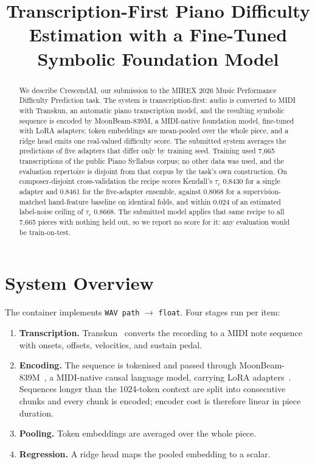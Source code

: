 \documentclass{article}
\title{Transcription-First Piano Difficulty Estimation with a Fine-Tuned
Symbolic Foundation Model}
\begin{document}
\maketitle

\begin{abstract}
We describe CrescendAI, our submission to the MIREX 2026 Music Performance
Difficulty Prediction task. The system is transcription-first: audio is
converted to MIDI with Transkun, an automatic piano transcription model, and
the resulting symbolic sequence is encoded by MoonBeam-839M, a MIDI-native
foundation model, fine-tuned with LoRA adapters; token embeddings are mean-pooled
over the whole piece, and a ridge head emits one real-valued difficulty score.
The submitted system averages the predictions of five adapters that differ only
by training seed. Training used 7{,}665 transcriptions of the public Piano
Syllabus corpus; no other data was used, and the evaluation repertoire is
disjoint from that corpus by the task's own construction. On composer-disjoint
cross-validation the recipe scores Kendall's $\tau_c$ 0.8430 for a single
adapter and 0.8461 for the five-adapter ensemble, against 0.8068 for a
supervision-matched hand-feature baseline on identical folds, and within 0.024
of an estimated label-noise ceiling of $\tau_c$ 0.8668. The submitted model
applies that same recipe to all 7{,}665 pieces with nothing held out, so we
report no score for it: any evaluation would be train-on-test.
\end{abstract}

\section{System Overview}\label{sec:overview}

The container implements \texttt{WAV path} $\rightarrow$ \texttt{float}. Four
stages run per item:

\begin{enumerate}
\itemsep0em
\item \textbf{Transcription.} Transkun~\cite{transkun} converts the recording
      to a MIDI note sequence with onsets, offsets, velocities, and sustain
      pedal.
\item \textbf{Encoding.} The sequence is tokenised and passed through
      MoonBeam-839M~\cite{moonbeam2025}, a MIDI-native causal language model,
      carrying LoRA adapters~\cite{hu2022lora}. Sequences longer than the
      1024-token context are split into consecutive chunks and every chunk is
      encoded; encoder cost is therefore linear in piece duration.
\item \textbf{Pooling.} Token embeddings are averaged over the whole piece.
\item \textbf{Regression.} A ridge head maps the pooled embedding to a scalar.
\end{enumerate}
\end{document}
